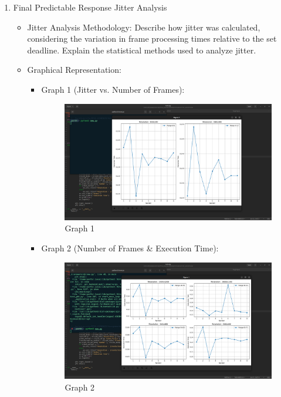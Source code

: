 \documentclass[a4paper,11pt]{article}%
\newenvironment{qanda}{\setlength{\parindent}{0pt}}{\bigskip}
\begin{document}
\begin{qanda}
\begin{enumerate}
\begin{enumerate}
				\item Final Predictable Response Jitter Analysis
				      \begin{itemize}
					      \item Jitter Analysis Methodology: Describe how jitter was calculated, considering the variation in frame processing times relative to the set deadline. Explain the statistical methods used to analyze jitter.
					      \item Graphical Representation:
					            \begin{itemize}
						            \item Graph 1 (Jitter vs. Number of Frames):
									 \begin{figure}[H]
										\centering
										\includegraphics[scale=0.25]{figures/fig1.png}
										\caption{Graph 1}
									\end{figure}
						            \item Graph 2 (Number of Frames \& Execution Time): \begin{figure}[H]
										\centering
										\includegraphics[scale=0.25]{figures/fig2.png}
										\caption{Graph 2}

\end{figure}
\end{itemize}
\end{itemize}
\end{enumerate}
\end{enumerate}
\end{qanda}
\end{document}
